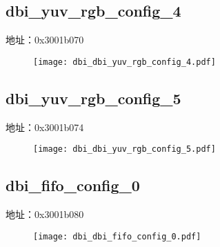 \subsection{dbi\_yuv\_rgb\_config\_4}
\label{dbi-dbi-yuv-rgb-config-4}
地址：0x3001b070
 \begin{figure}[H]
\texttt{[image: dbi\_dbi\_yuv\_rgb\_config\_4.pdf]}
\end{figure}

\subsection{dbi\_yuv\_rgb\_config\_5}
\label{dbi-dbi-yuv-rgb-config-5}
地址：0x3001b074
 \begin{figure}[H]
\texttt{[image: dbi\_dbi\_yuv\_rgb\_config\_5.pdf]}
\end{figure}

\subsection{dbi\_fifo\_config\_0}
\label{dbi-dbi-fifo-config-0}
地址：0x3001b080
 \begin{figure}[H]
\texttt{[image: dbi\_dbi\_fifo\_config\_0.pdf]}
\end{figure}

